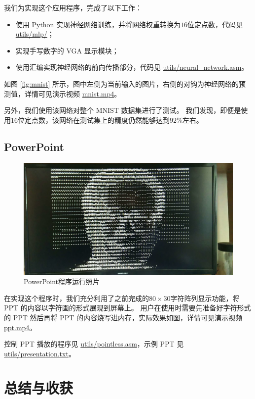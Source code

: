 \documentclass{article}
\begin{document}
我们为实现这个应用程序，完成了以下工作：
\begin{itemize}
    \item 使用 Python 实现神经网络训练，并将网络权重转换为$16$位定点数，代码见 \href{run:./utils/mlp}{utils/mlp/}；
    \item 实现手写数字的 VGA 显示模块；
    \item 使用汇编实现神经网络的前向传播部分，代码见 \href{run:./utils/neural_network.asm}{utils/neural\_network.asm}。
\end{itemize}

如图 \ref{fig:mnist} 所示，图中左侧为当前输入的图片，右侧的对钩为神经网络的预测值，详情可见演示视频 \href{run:.}{mnist.mp4}。

另外，我们使用该网络对整个 MNIST 数据集进行了测试。
我们发现，即便是使用$16$位定点数，该网络在测试集上的精度仍然能够达到$92\%$左右。

\subsection{PowerPoint}

\begin{figure}[ht]
\centering
\includegraphics[width=\textwidth]{figures/ha.png}
\caption{PowerPoint程序运行照片}
\label{fig:ppt}
\end{figure}

在实现这个程序时，我们充分利用了之前完成的$80 \times 30$字符阵列显示功能，将 PPT 的内容以字符画的形式展现到屏幕上。
用户在使用时需要先准备好字符形式的 PPT 然后再将 PPT 的内容烧写进内存，实际效果如图，详情可见演示视频 \href{run:.}{ppt.mp4}。

控制 PPT 播放的程序见 \href{run:utils/pointless.asm}{utils/pointless.asm}，示例 PPT 见 \href{run:utils/presentation.txt}{utils/presentation.txt}。

\section{总结与收获}
\end{document}
